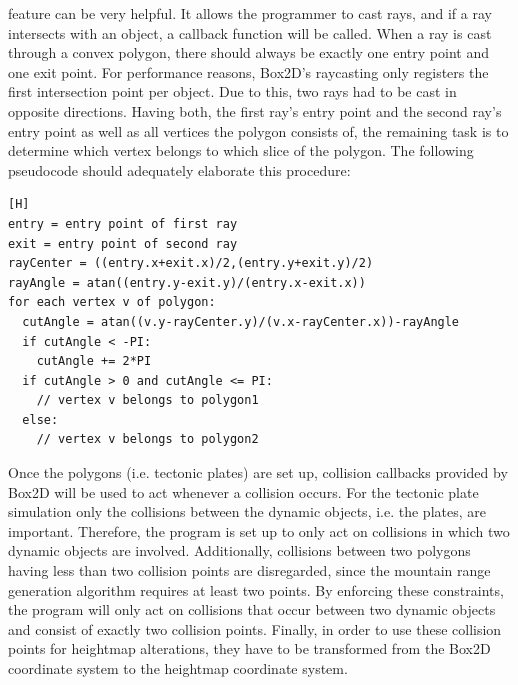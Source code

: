 \documentclass[11pt,a4paper,twoside,openright]{report}
\begin{document}
feature can be very helpful. It allows the programmer to cast rays, and if a ray intersects with an object, a callback function will be called. When a ray is cast through a convex polygon, there should always be exactly one entry point and one exit point. For performance reasons, Box2D's raycasting only registers the first intersection point per object. Due to this, two rays had to be cast in opposite directions. Having both, the first ray's entry point and the second ray's entry point as well as all vertices the polygon consists of, the remaining task is to determine which vertex belongs to which slice of the polygon. The following pseudocode should adequately elaborate this procedure:

\begin{lstlisting}[caption=Point in slice check pseudocode][H]
entry = entry point of first ray
exit = entry point of second ray
rayCenter = ((entry.x+exit.x)/2,(entry.y+exit.y)/2)
rayAngle = atan((entry.y-exit.y)/(entry.x-exit.x))
for each vertex v of polygon:
  cutAngle = atan((v.y-rayCenter.y)/(v.x-rayCenter.x))-rayAngle
  if cutAngle < -PI:
    cutAngle += 2*PI
  if cutAngle > 0 and cutAngle <= PI:
    // vertex v belongs to polygon1
  else:
    // vertex v belongs to polygon2
\end{lstlisting}

\noindent Once the polygons (i.e. tectonic plates) are set up, collision callbacks provided by Box2D will be used to act whenever a collision occurs. For the tectonic plate simulation only the collisions between the dynamic objects, i.e. the plates, are important. Therefore, the program is set up to only act on collisions in which two dynamic objects are involved. Additionally, collisions between two polygons having less than two collision points are disregarded, since the mountain range generation algorithm requires at least two points. By enforcing these constraints, the program will only act on collisions that occur between two dynamic objects and consist of exactly two collision points. Finally, in order to use these collision points for heightmap alterations, they have to be transformed from the Box2D coordinate system to the heightmap coordinate system.
\end{document}
